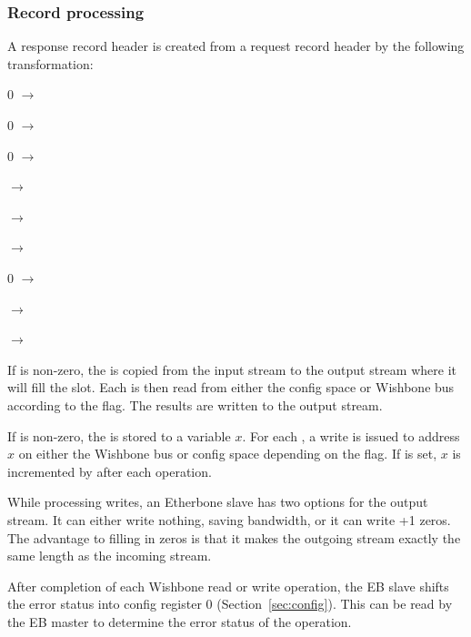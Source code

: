 \documentclass{article}
\newenvironment{packed_itemize}{
\begin{itemize}
  \setlength{\itemsep}{1pt}
  \setlength{\parskip}{0pt}
  \setlength{\parsep}{0pt}
}{\end{itemize}}
\begin{document}
\subsubsection{Record processing}

A response record header is created from a request record header by the
following transformation:
\begin{packed_itemize}
\item 0 $\to$ 
\item 0 $\to$ 
\item 0 $\to$ 
\item {} $\to$ 
\item {} $\to$ 
\item {} $\to$ 
\item 0 $\to$ 
\item {} $\to$ 
\item {} $\to$ 
\end{packed_itemize}

If  is non-zero,
the  is copied from the input stream to the
output stream where it will fill the  slot.
Each  is then read from either the config space or
Wishbone bus according to the  flag.
The results are written to the output stream.

If  is non-zero,
the  is stored to a variable $x$.
For each , 
a write is issued to address $x$ on either the Wishbone bus or config space
depending on the  flag.
If  is set, 
$x$ is incremented by  after each operation.

While processing writes,
an Etherbone slave has two options for the output stream.
It can either write nothing, saving bandwidth,
or it can write +1 zeros.
The advantage to filling in zeros is that it makes the outgoing stream exactly
the same length as the incoming stream.

After completion of each Wishbone read or write operation,
the EB slave shifts the error status into config register 0
(Section~\ref{sec:config}).
This can be read by the EB master to determine the error status of the
operation.
\end{document}
